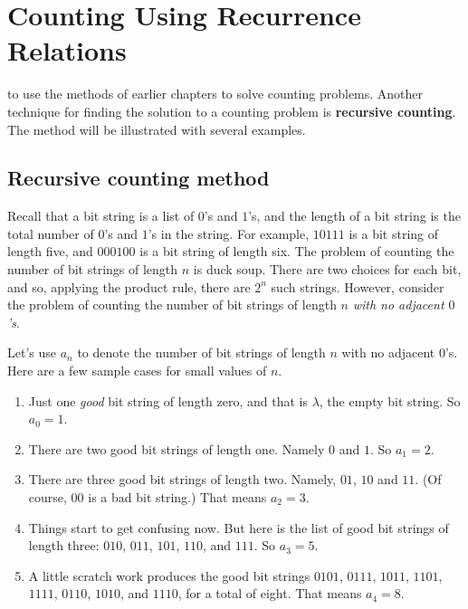 \chapter{Counting Using Recurrence Relations}\label{chpt:counting use recur}


 to use the methods of earlier chapters to solve
counting problems. Another technique for finding the solution to a counting
problem is {\bfseries recursive counting}. The method will be illustrated
with several examples.

\section{Recursive counting method}
\begin{exmp}\label{exmp:recur bit strings n}
 Recall that a bit string is a list of $0$'s and $1$'s, and the
 length of a bit string is the total number of $0$'s and $1$'s in the string. For
 example, $10111$ is a bit string of length five, and $000100$ is a bit string of
 length six. The problem of counting the number of bit strings of length $n$
 is duck soup. There are two choices for each bit, and so, applying the product
 rule, there are $2^n$ such strings. However, consider the problem of counting the
 number of bit strings of length $n$ {\itshape with no adjacent $0$'s}.
 
 Let's use $a_n$ to denote the number of bit strings of length $n$ with no
 adjacent $0$'s. Here are a few sample cases for small values of $n$.
 \begin{enumerate}[label=\bfseries {n=\arabic*:},start=0]
   \item Just one {\itshape good} bit string of length zero, and that is
   $\lambda$, the empty bit string. So $a_0 = 1$.
   
   \item There are two good bit strings of length one. Namely $0$ and
   $1$. So $a_1 = 2$.
   
   \item There are three good bit strings of length two. Namely, $01$,
   $10$ and $11$. (Of course, $00$ is a bad bit string.) That means $a_2=3$.
   
   \item Things start to get confusing now. But here is the list of good
   bit strings of length three: $010$, $011$, $101$, $110$, and $111$. So $a_3=5$.
   
   \item A little scratch work produces the good bit strings $0101$,
   $0111$, $1011$, $1101$, $1111$, $0110$, $1010$, and $1110$, for a total of eight.
   That means $a_4 = 8$.  
 \end{enumerate}
 

\end{exmp}

